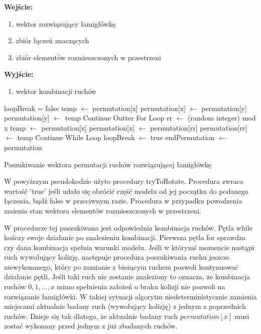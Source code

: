 \textbf{Wejście:}
\begin{enumerate}
\item wektor rozwiązujący łamigłówkę
\item zbiór łączeń znaczących
\item zbiór elementów rozmieszczonych w przestrzeni
\end{enumerate}
\textbf{Wyjście:}
\begin{enumerate}
\item wektor kombinacji ruchów
\end{enumerate}
{\small
	\begin{pseudokod}[H]
	loopBreak = false\;
    {
        {
            {
                {
                    temp $\leftarrow$ permutation[x]\;
                    permutation[x] $\leftarrow$ permutation[y]\;
                    permutation[y] $\leftarrow$ temp\;
                    {
						Continue Outter For Loop\;
					}
                }
                rr $\leftarrow$ (random integer) mod x\;
                temp $\leftarrow$ permutation[x]\;
                permutation[x] $\leftarrow$ permutation[rr]\;
                permutation[rr] $\leftarrow$ temp\;
                Continue While Loop\;
            }
        }
		loopBreak $\leftarrow$ true\;
    }
	endPermutation $\leftarrow$ permutation\;
	\caption{Poszukiwanie wektora permutacji ruchów rozwiązującej łamigłówkę}\label{alg:mine}
	\end{pseudokod}
}

W powyższym pseudokodzie użyto procedury tryToRotate. Procedura zwraca wartość 'true' jeśli udało się obrócić część modelu od jej początku do podanego łączenia, bądź false w przeciwnym razie. Procedura w przypadku powodzenia zmienia stan wektora elementów rozmieszczonych w przestrzeni.

W procedurze tej poszukiwana jest odpowiednia kombinacja ruchów. Pętla while kończy swoje działanie po znalezieniu kombinacji. Pierwsza pętla for sprawdza czy dana kombinacja spełnia warunki modelu. Jeśli w którymś momencie nastąpi ruch wywołujący kolizję, następuje procedura poszukiwania ruchu jeszcze niewykonanego, który po zamianie z bieżącym ruchem pozwoli kontynuować działanie pętli. Jeśli taki ruch nie zostanie znaleziony to oznacza, że kombinacja ruchów $0,1,\ldots,x$ mimo spełnienia założeń o braku kolizji nie pozwoli na rozwiązanie łamigłówki. W takiej sytuacji algorytm niedeterministycznie zamienia miejscami aktualnie badany ruch (wywołujący kolizję) z jednym z poprzednich ruchów. Dzieje się tak dlatego, że aktualnie badany ruch $permutation[x]$ musi zostać wykonany przed jednym z już zbadanych ruchów.

